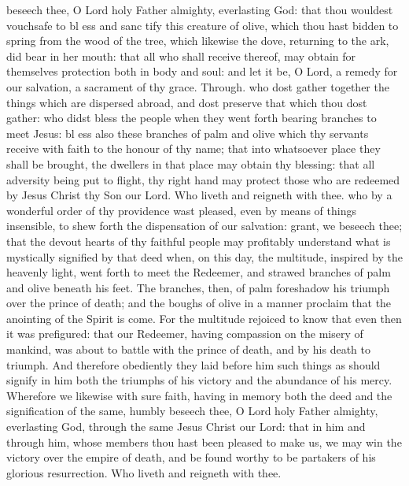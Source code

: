 
\vspace{1\baselineskip}
\par\noindent
{}
{} beseech thee, O Lord holy Father almighty, everlasting God: that thou wouldest vouchsafe to bl {} ess and sanc {} tify this creature of olive, which thou hast bidden to spring from the wood of the tree, which likewise the dove, returning to the ark, did bear in her mouth: that all who shall receive thereof, may obtain for themselves protection both in body and soul: and let it be, O Lord, a remedy for our salvation, a sacrament
of thy grace. Through.
{} who dost gather together the things which are dispersed abroad, and dost preserve that which thou dost gather: who didst bless the people when they went forth bearing branches to meet Jesus: bl {} ess also these branches of palm and olive which thy servants receive with faith to the honour of thy name; that into whatsoever place they shall be brought, the dwellers in that place may obtain thy blessing: that all adversity being put to flight, thy right hand may protect those who are redeemed by Jesus Christ thy Son our Lord. Who liveth and reigneth with thee.
{} who by a wonderful order of thy providence wast pleased, even by means of things insensible, to shew forth the dispensation of our salvation: grant, we beseech thee; that the devout hearts of thy faithful people may profitably understand what is mystically signified by that deed when, on this day, the multitude, inspired by the heavenly light, went forth to meet the Redeemer, and strawed branches of palm and olive beneath his feet. The branches, then, of palm foreshadow his triumph over the prince of death; and the boughs of olive in a manner proclaim that the anointing of the Spirit is come. For the multitude rejoiced to know that even then it was prefigured: that our Redeemer, having compassion on the misery of mankind, was about to battle with the prince of death, and by his death to triumph. And therefore obediently they laid before him such things as should signify in him both the triumphs of his victory and the abundance of his mercy. Wherefore we likewise with sure faith, having in memory both the deed and the signification of the same, humbly beseech thee, O Lord holy Father almighty, everlasting God, through the same Jesus Christ our Lord: that in him and through him, whose members thou hast been pleased to make us, we may win the victory over the empire of death, and be found worthy to be partakers of his glorious resurrection. Who liveth and reigneth with thee.
